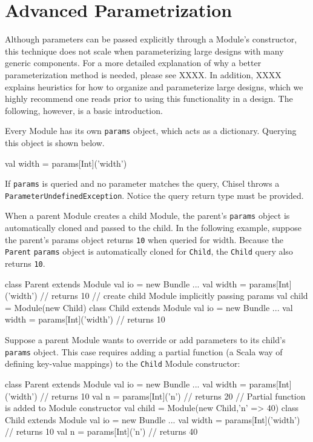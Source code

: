 \section{Advanced Parametrization}

Although parameters can be passed explicitly through a Module's constructor, this technique does not scale when parameterizing large designs with many generic components. For a more detailed explanation of why a better parameterization method is needed, please see XXXX. In addition, XXXX explains heuristics for how to organize and parameterize large designs, which we highly recommend one reads prior to using this functionality in a design. The following, however, is a basic introduction.

Every Module has its own \verb+params+ object, which acts as a dictionary. Querying this object is shown below.

\begin{scala}
val width = params[Int]('width')
\end{scala}

If \verb+params+ is queried and no parameter matches the query, Chisel throws a \verb+ParameterUndefinedException+. Notice the query return type must be provided.

When a parent Module creates a child Module, the parent's \verb+params+ object is automatically cloned and passed to the child. In the following example, suppose the parent's params object returns \verb+10+ when queried for width. Because the \verb+Parent+ \verb+params+ object is automatically cloned for \verb+Child+, the \verb+Child+ query also returns \verb+10+.

\begin{scala}
class Parent extends Module {
  val io = new Bundle { ... }
  val width = params[Int]('width') // returns 10
  // create child Module implicitly passing params
  val child = Module(new Child) 
}
class Child extends Module {
  val io = new Bundle { ... }
  val width = params[Int]('width') // returns 10
}
\end{scala}

Suppose a parent Module wants to override or add parameters to its child's \verb+params+ object. This case requires adding a partial function (a Scala way of defining key-value mappings) to the \verb+Child+ Module constructor:

\begin{scala}
class Parent extends Module {
  val io = new Bundle { ... }
  val width = params[Int]('width') // returns 10
  val n = params[Int]('n') // returns 20
  // Partial function is added to Module constructor
  val child = Module(new Child,{'n' => 40})
}
class Child extends Module {
  val io = new Bundle { ... }
  val width = params[Int]('width') // returns 10
  val n = params[Int]('n') // returns 40
}
\end{scala}

